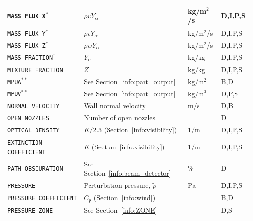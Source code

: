 \documentclass[11pt]{book}
\newcommand{\ct}{\tt\small}
\newcommand{\tp}{\tilde{p}}
\begin{document}
\begin{longtable}{@{\extracolsep{\fill}}|l|l|l|l|}
{\ct MASS FLUX X}$^*$                           & $\rho u Y_\alpha$                             & kg/m$^2$/s     & D,I,P,S      \\ \hline
{\ct MASS FLUX Y}$^*$                           & $\rho v Y_\alpha$                             & kg/m$^2$/s     & D,I,P,S      \\ \hline
{\ct MASS FLUX Z}$^*$                           & $\rho w Y_\alpha$                             & kg/m$^2$/s     & D,I,P,S      \\ \hline
{\ct MASS FRACTION}$^*$                         & $Y_\alpha$                                    & kg/kg          & D,I,P,S      \\ \hline
{\ct MIXTURE FRACTION}                          & $Z$                                           & kg/kg          & D,I,P,S      \\ \hline
{\ct MPUA}$^{**}$                               & See Section~\ref{info:part_output}            & kg/m$^2$       & B,D          \\ \hline
{\ct MPUV}$^{**}$                               & See Section~\ref{info:part_output}            & kg/m$^3$       & D,P,S        \\ \hline
{\ct NORMAL VELOCITY}                           & Wall normal velocity                          & m/s            & D,B          \\ \hline
{\ct OPEN NOZZLES}                              & Number of open nozzles                        &                & D            \\ \hline
{\ct OPTICAL DENSITY}                           & $K/2.3$ (Section~\ref{info:visibility})       & 1/m            & D,I,P,S      \\ \hline
{\ct EXTINCTION COEFFICIENT}                    & $K$ (Section~\ref{info:visibility})           & 1/m            & D,I,P,S      \\ \hline
{\ct PATH OBSCURATION}                          & See Section~\ref{info:beam_detector}          & \%             & D            \\ \hline
{\ct PRESSURE}                                  & Perturbation pressure, $\tp$                  & Pa             & D,I,P,S      \\ \hline
{\ct PRESSURE COEFFICIENT}                      & $C_p$ (Section~\ref{info:wind})               &                & B,D          \\ \hline
{\ct PRESSURE ZONE}                             & See Section~\ref{info:ZONE}                   &                & D,S          \\ \hline

\end{longtable}
\end{document}
